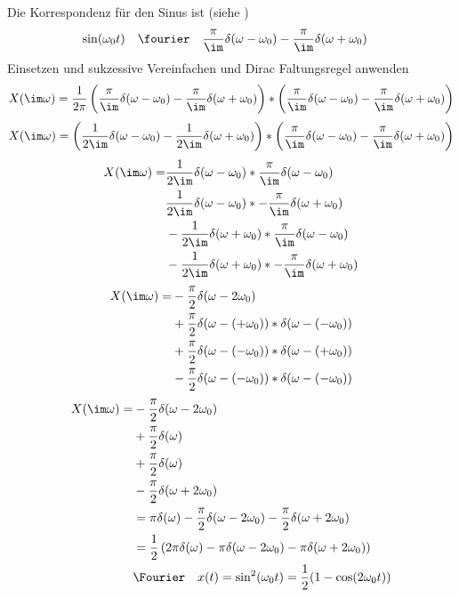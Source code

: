 \begin{ExCalc}
Die Korrespondenz für den Sinus ist (siehe )
\begin{align}
\sin(\omega_0 t) &\quad \fourier \quad \frac{\pi}{\im} \delta(\omega -\omega_0) - \frac{\pi}{\im} \delta(\omega + \omega_0)
\end{align}
Einsetzen und sukzessive Vereinfachen und Dirac Faltungsregel anwenden
\begin{equation}
  X(\im\omega) = \frac{1}{2\pi}
  \left(\frac{\pi}{\im} \delta(\omega -\omega_0) - \frac{\pi}{\im} \delta(\omega + \omega_0)\right)
  \ast
  \left(\frac{\pi}{\im} \delta(\omega -\omega_0) - \frac{\pi}{\im} \delta(\omega + \omega_0)\right)
\end{equation}
\begin{equation}
  X(\im\omega) =
  \left(\frac{1}{2\im} \delta(\omega -\omega_0) - \frac{1}{2\im} \delta(\omega + \omega_0)\right)
  \ast
  \left(\frac{\pi}{\im} \delta(\omega -\omega_0) - \frac{\pi}{\im} \delta(\omega + \omega_0)\right)
\end{equation}
\begin{align}
  X(\im\omega) =
  &\frac{1}{2\im} \delta(\omega -\omega_0) \ast \frac{\pi}{\im} \delta(\omega -\omega_0)\\\nonumber
  &\frac{1}{2\im} \delta(\omega -\omega_0) \ast - \frac{\pi}{\im} \delta(\omega + \omega_0)\\\nonumber
  &- \frac{1}{2\im} \delta(\omega + \omega_0) \ast \frac{\pi}{\im} \delta(\omega -\omega_0)\\\nonumber
  &- \frac{1}{2\im} \delta(\omega + \omega_0) \ast - \frac{\pi}{\im} \delta(\omega + \omega_0)
\end{align}
\begin{align}
  X(\im\omega) =
  &-\frac{\pi}{2} \delta(\omega -2 \omega_0)\\\nonumber
  &+\frac{\pi}{2} \delta(\omega -(+\omega_0)) \ast \delta(\omega - (-\omega_0))\\\nonumber
  &+\frac{\pi}{2} \delta(\omega -(-\omega_0)) \ast \delta(\omega -(+\omega_0))\\\nonumber
  &-\frac{\pi}{2} \delta(\omega -(-\omega_0)) \ast \delta(\omega -(-\omega_0))
\end{align}
\begin{align}
  X(\im\omega) =
  &-\frac{\pi}{2} \delta(\omega -2 \omega_0)\\\nonumber
  &+\frac{\pi}{2} \delta(\omega)\\\nonumber
  &+\frac{\pi}{2} \delta(\omega)\\\nonumber
  &-\frac{\pi}{2} \delta(\omega +2 \omega_0)\\\nonumber
  & =\pi \delta(\omega) -\frac{\pi}{2} \delta(\omega -2 \omega_0) - \frac{\pi}{2} \delta(\omega +2 \omega_0)\\\nonumber
  & =\frac{1}{2} \left(2 \pi \delta(\omega) - \pi \delta(\omega -2 \omega_0) - \pi \delta(\omega +2 \omega_0)\right)\\\nonumber
  & \Fourier \quad x(t) = \sin^2(\omega_0 t) = \frac{1}{2} (1 - \cos(2\omega_0 t))
\end{align}

\end{ExCalc}
